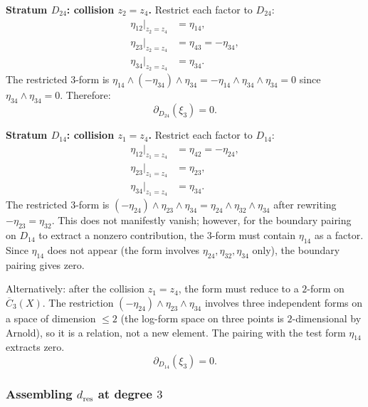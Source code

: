\medskip
\noindent\textbf{Stratum $D_{24}$: collision $z_2 = z_4$.}
Restrict each factor to $D_{24}$:
\begin{align*}
\eta_{12}\big|_{z_2 = z_4} &= \eta_{14}, \\
\eta_{23}\big|_{z_2 = z_4} &= \eta_{43} = -\eta_{34}, \\
\eta_{34}\big|_{z_2 = z_4} &= \eta_{34}.
\end{align*}
The restricted $3$-form is
$\eta_{14} \wedge (-\eta_{34}) \wedge \eta_{34}
= -\eta_{14} \wedge \eta_{34} \wedge \eta_{34} = 0$
since $\eta_{34} \wedge \eta_{34} = 0$.
Therefore:
\begin{equation}\label{eq:frame-D24-deg3}
\partial_{D_{24}}(\xi_3) = 0.
\end{equation}

\medskip
\noindent\textbf{Stratum $D_{14}$: collision $z_1 = z_4$.}
Restrict each factor to $D_{14}$:
\begin{align*}
\eta_{12}\big|_{z_1 = z_4} &= \eta_{42} = -\eta_{24}, \\
\eta_{23}\big|_{z_1 = z_4} &= \eta_{23}, \\
\eta_{34}\big|_{z_1 = z_4} &= \eta_{34}.
\end{align*}
The restricted $3$-form is
$(-\eta_{24}) \wedge \eta_{23} \wedge \eta_{34}
= \eta_{24} \wedge \eta_{32} \wedge \eta_{34}$
after rewriting $-\eta_{23} = \eta_{32}$.
This does not manifestly vanish; however, for the boundary
pairing on $D_{14}$ to extract a nonzero contribution, the
$3$-form must contain $\eta_{14}$ as a factor.  Since $\eta_{14}$
does not appear (the form involves $\eta_{24}, \eta_{32}, \eta_{34}$
only), the boundary pairing gives zero.

Alternatively: after the collision $z_1 = z_4$, the form must
reduce to a $2$-form on $\overline{C}_3(X)$.  The restriction
$(-\eta_{24}) \wedge \eta_{23} \wedge \eta_{34}$ involves three
independent forms on a space of dimension $\leq 2$ (the log-form
space on three points is $2$-dimensional by Arnold), so it is a
relation, not a new element.  The pairing with the test form
$\eta_{14}$ extracts zero.
\begin{equation}\label{eq:frame-D14-deg3}
\partial_{D_{14}}(\xi_3) = 0.
\end{equation}

\subsubsection*{Assembling $d_{\mathrm{res}}$ at degree $3$}

